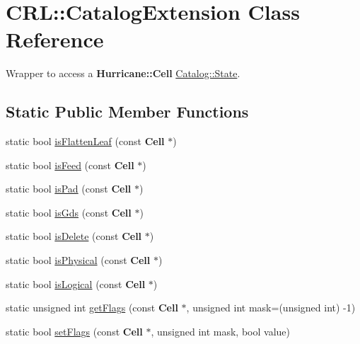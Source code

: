\hypertarget{classCRL_1_1CatalogExtension}{}\section{C\+RL\+:\+:Catalog\+Extension Class Reference}
\label{classCRL_1_1CatalogExtension}


Wrapper to access a \textbf{ Hurricane\+::\+Cell} \mbox{\hyperlink{classCRL_1_1Catalog_1_1State}{Catalog\+::\+State}}.  


\subsection*{Static Public Member Functions}
\begin{DoxyCompactItemize}
\item 
static bool \mbox{\hyperlink{classCRL_1_1CatalogExtension_af6487fb6007e34163773d8e8d15013a1}{is\+Flatten\+Leaf}} (const \textbf{ Cell} $\ast$)
\item 
static bool \mbox{\hyperlink{classCRL_1_1CatalogExtension_a5feda5d6fba490a71e3742361ec7b4a1}{is\+Feed}} (const \textbf{ Cell} $\ast$)
\item 
static bool \mbox{\hyperlink{classCRL_1_1CatalogExtension_a2695acabeac2f224fa4ac3a9563aeee9}{is\+Pad}} (const \textbf{ Cell} $\ast$)
\item 
static bool \mbox{\hyperlink{classCRL_1_1CatalogExtension_a37c8d304e7386ee31b73c826cb929e5f}{is\+Gds}} (const \textbf{ Cell} $\ast$)
\item 
static bool \mbox{\hyperlink{classCRL_1_1CatalogExtension_a90e941d2349f5a0f4f7fefb41b434b0a}{is\+Delete}} (const \textbf{ Cell} $\ast$)
\item 
static bool \mbox{\hyperlink{classCRL_1_1CatalogExtension_a3af53ef4a7fa512a079adbcb68677e2f}{is\+Physical}} (const \textbf{ Cell} $\ast$)
\item 
static bool \mbox{\hyperlink{classCRL_1_1CatalogExtension_a558c506a28d2230e592080dccbcca380}{is\+Logical}} (const \textbf{ Cell} $\ast$)
\item 
static unsigned int \mbox{\hyperlink{classCRL_1_1CatalogExtension_a9525c2253aa310a63de32caaeb694e66}{get\+Flags}} (const \textbf{ Cell} $\ast$, unsigned int mask=(unsigned int) -\/1)
\item 
static bool \mbox{\hyperlink{classCRL_1_1CatalogExtension_ab9475735032d500f4d4a8cf980864b3e}{set\+Flags}} (const \textbf{ Cell} $\ast$, unsigned int mask, bool value)
\item 

\end{DoxyCompactItemize}
